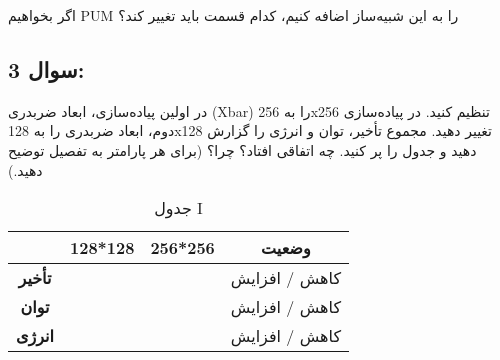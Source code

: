 \documentclass[12pt]{exam}
\begin{document}
\begin{questions}
	اگر بخواهیم PUM را به این شبیه‌ساز اضافه کنیم، کدام قسمت باید تغییر کند؟
	
	\subsection*{سوال 3:}
	
	در اولین پیاده‌سازی، ابعاد ضربدری (Xbar) را به 256x256 تنظیم کنید. در پیاده‌سازی دوم، ابعاد ضربدری را به 128x128 تغییر دهید. مجموع تأخیر، توان و انرژی را گزارش دهید و جدول را پر کنید. چه اتفاقی افتاد؟ چرا؟ (برای هر پارامتر به تفصیل توضیح دهید.)
	
	\begin{table}[h]
		\centering
		\begin{tabular}{|c|c|c|c|}
			\hline
			& \textbf{128*128} & \textbf{256*256} & \textbf{وضعیت} \\ \hline
			\textbf{تأخیر} & & & کاهش / افزایش \\ \hline
			\textbf{توان} & & & کاهش / افزایش \\ \hline
			\textbf{انرژی} & & & کاهش / افزایش \\ \hline
		\end{tabular}
		\caption{جدول I}
	\end{table}
		
	
 \end{questions}
\end{document}

